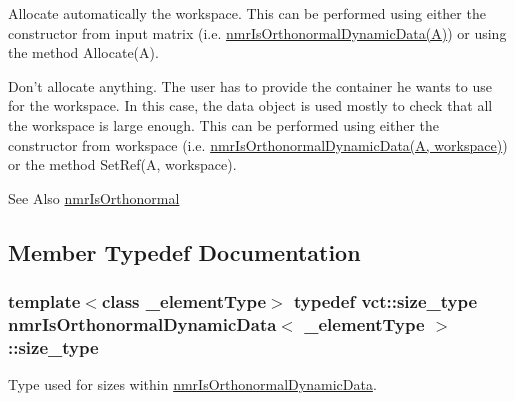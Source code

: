 \begin{DoxyItemize}
\item Allocate automatically the workspace. This can be performed using either the constructor from input matrix (i.\-e. \hyperlink{classnmr_is_orthonormal_dynamic_data}{nmr\-Is\-Orthonormal\-Dynamic\-Data(\-A)}) or using the method Allocate(\-A).
\item Don't allocate anything. The user has to provide the container he wants to use for the workspace. In this case, the data object is used mostly to check that all the workspace is large enough. This can be performed using either the constructor from workspace (i.\-e. \hyperlink{classnmr_is_orthonormal_dynamic_data}{nmr\-Is\-Orthonormal\-Dynamic\-Data(\-A, workspace)}) or the method Set\-Ref(\-A, workspace).
\end{DoxyItemize}

\begin{DoxySeeAlso}{See Also}
\hyperlink{nmr_is_orthonormal_8h_acf0ff1e2dbe0c988db04d9db1e2e7697}{nmr\-Is\-Orthonormal} 
\end{DoxySeeAlso}


\subsection{Member Typedef Documentation}
\hypertarget{classnmr_is_orthonormal_dynamic_data_ae69581f9b270b49b1cd1d16ff29a5409}{
\subsubsection[{size\-\_\-type}]{\setlength{\rightskip}{0pt plus 5cm}template$<$class \-\_\-element\-Type$>$ typedef {\bf vct\-::size\-\_\-type} {\bf nmr\-Is\-Orthonormal\-Dynamic\-Data}$<$ \-\_\-element\-Type $>$\-::{\bf size\-\_\-type}}}\label{classnmr_is_orthonormal_dynamic_data_ae69581f9b270b49b1cd1d16ff29a5409}
Type used for sizes within \hyperlink{classnmr_is_orthonormal_dynamic_data}{nmr\-Is\-Orthonormal\-Dynamic\-Data}. 

